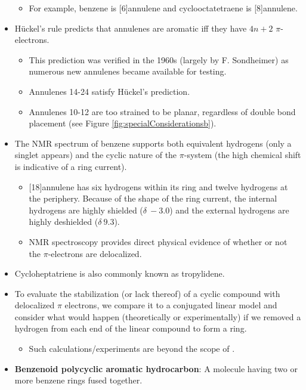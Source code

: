\documentclass[../notes.tex]{subfiles}
\begin{document}
\begin{itemize}
\begin{itemize}
        \item For example, benzene is [6]annulene and cyclooctatetraene is [8]annulene.
    \end{itemize}
    \item H\"{u}ckel's rule predicts that annulenes are aromatic iff they have $4n+2$ $\pi$-electrons.
    \begin{itemize}
        \item This prediction was verified in the 1960s (largely by F. Sondheimer) as numerous new annulenes became available for testing.
        \item Annulenes 14-24 satisfy H\"{u}ckel's prediction.
        \item Annulenes 10-12 are too strained to be planar, regardless of double bond placement (see Figure \ref{fig:specialConsiderationsb}).
    \end{itemize}
    \item The  NMR spectrum of benzene supports both equivalent hydrogens (only a singlet appears) and the cyclic nature of the $\pi$-system (the high chemical shift is indicative of a ring current).
    \begin{itemize}
        \item {}[18]annulene has six hydrogens within its ring and twelve hydrogens at the periphery. Because of the shape of the ring current, the internal hydrogens are highly shielded ($\delta\ -3.0$) and the external hydrogens are highly deshielded ($\delta\ 9.3$).
        \item NMR spectroscopy provides direct physical evidence of whether or not the $\pi$-electrons are delocalized.
    \end{itemize}
    \item Cycloheptatriene is also commonly known as tropylidene.
    \item To evaluate the stabilization (or lack thereof) of a cyclic compound with delocalized $\pi$ electrons, we compare it to a conjugated linear model and consider what would happen (theoretically or experimentally) if we removed a hydrogen from each end of the linear compound to form a ring.
    \begin{itemize}
        \item Such calculations/experiments are beyond the scope of \textcite{bib:SolomonsEtAl}.
    \end{itemize}
    \item \textbf{Benzenoid polycyclic aromatic hydrocarbon}: A molecule having two or more benzene rings fused together.

\end{itemize}
\end{document}

